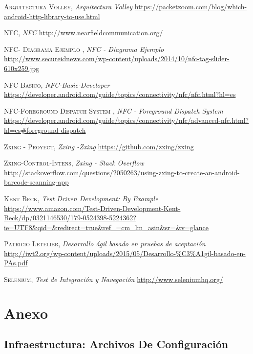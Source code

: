\documentclass[a4paper,11pt]{book}
\begin{document}
\begin{thebibliography}{aaaa}
 \textsc{Arquitectura Volley},
\textit{Arquitectura Volley}
\url{https://packetzoom.com/blog/which-android-http-library-to-use.html}

 \textsc{NFC},
\textit{NFC}
\url{http://www.nearfieldcommunication.org/}

 \textsc{ NFC- Diagrama Ejemplo },
\textit{NFC -  Diagrama Ejemplo}
\url{http://www.secureidnews.com/wp-content/uploads/2014/10/nfc-tag-slider-610x259.jpg}

 \textsc{NFC Basico},
\textit{NFC-Basic-Developer}
\url{https://developer.android.com/guide/topics/connectivity/nfc/nfc.html?hl=es}

 \textsc{ NFC-Foreground Dispatch System },
\textit{NFC -  Foreground Dispatch System}
\url{https://developer.android.com/guide/topics/connectivity/nfc/advanced-nfc.html?hl=es#foreground-dispatch}




 \textsc{ Zxing - Proyect},
\textit{Zxing -Zxing}
\url{https://github.com/zxing/zxing}

 \textsc{ Zxing-Control-Intens},
\textit{Zxing - Stack Overflow}
\url{http://stackoverflow.com/questions/2050263/using-zxing-to-create-an-android-barcode-scanning-app}



 \textsc{Kent Beck},
\textit{Test Driven Development: By Example}
\url{https://www.amazon.com/Test-Driven-Development-Kent-Beck/dp/0321146530/179-0524398-5224362?ie=UTF8&qid=&redirect=true&ref_=cm_lm_asin&sr=&v=glance}


 \textsc{Patricio Letelier},
\textit{Desarrollo ágil basado en pruebas de aceptación}
\url{http://iwt2.org/wp-content/uploads/2015/05/Desarrollo-\%C3\%A1gil-basado-en-PAs.pdf}

 \textsc{Selenium},
\textit{Test de Integración y Navegación}
\url{http://www.seleniumhq.org/}

\end{thebibliography}
 

\chapter{Anexo}
\section{Infraestructura: Archivos De Configuración}
\end{document}

